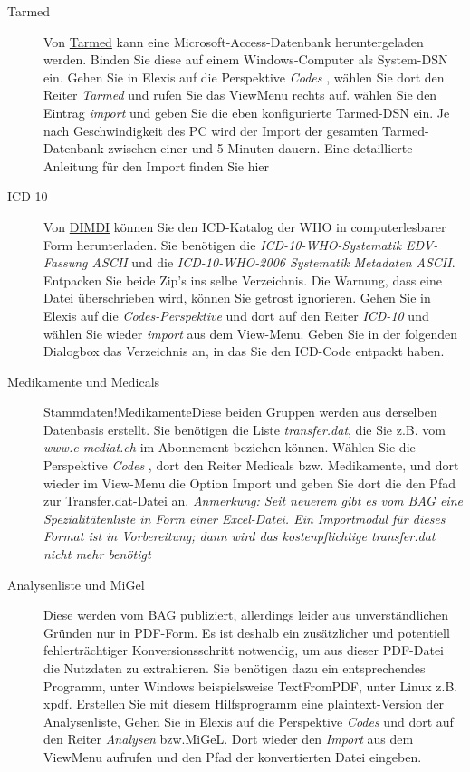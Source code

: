 \begin{description}
 \item[Tarmed] Von \href{www.tarmedsuisse.ch}{Tarmed} kann eine Microsoft-Access-Datenbank heruntergeladen werden. Binden Sie diese auf einem Windows-Computer als System-DSN ein. Gehen Sie in Elexis auf die Perspektive  \textit{Codes} , wählen Sie dort den Reiter  \textit{Tarmed}  und rufen Sie das ViewMenu rechts auf. wählen Sie den Eintrag  \textit{import}  und geben Sie die eben konfigurierte Tarmed-DSN ein. Je nach Geschwindigkeit des PC wird der Import der gesamten Tarmed-Datenbank zwischen einer und 5 Minuten dauern. Eine detaillierte Anleitung für den Import finden Sie hier
 \item[ICD-10] Von \href{http://www.dimdi.de/dynamic/de/klassi/downloadcenter/icd-10-who/version2006/systematik/}{DIMDI} können Sie den ICD-Katalog der WHO in computerlesbarer Form herunterladen. Sie benötigen die \textit{ICD-10-WHO-Systematik EDV-Fassung ASCII} und die \textit{ICD-10-WHO-2006 Systematik Metadaten ASCII}. Entpacken Sie beide Zip's ins selbe Verzeichnis. Die Warnung, dass eine Datei überschrieben wird, können Sie getrost ignorieren. Gehen Sie in Elexis auf die \textit{Codes-Perspektive} und dort auf den Reiter  \textit{ICD-10}  und wählen Sie wieder  \textit{import}  aus dem View-Menu. Geben Sie in der folgenden Dialogbox das Verzeichnis an, in das Sie den ICD-Code entpackt haben.
 \item[Medikamente und Medicals] \indexname{Stammdaten!Medikamente}Diese beiden Gruppen werden aus derselben Datenbasis erstellt. Sie benötigen die Liste \textit{transfer.dat}, die Sie z.B. vom \textit{www.e-mediat.ch} im Abonnement beziehen können. Wählen Sie die Perspektive  \textit{Codes} , dort den Reiter Medicals bzw. Medikamente, und dort wieder im View-Menu die Option Import und geben Sie dort die den Pfad zur Transfer.dat-Datei an.
\textit{Anmerkung: Seit neuerem gibt es vom BAG eine Spezialitätenliste in Form einer Excel-Datei. Ein Importmodul für dieses Format ist in Vorbereitung; dann wird das kostenpflichtige transfer.dat nicht mehr benötigt  }
 \item[Analysenliste und MiGel] Diese werden vom BAG publiziert, allerdings leider aus unverständlichen Gründen nur in PDF-Form. Es ist deshalb ein zusätzlicher und potentiell fehlerträchtiger Konversionsschritt notwendig, um aus dieser PDF-Datei die Nutzdaten zu extrahieren. Sie benötigen dazu ein entsprechendes Programm, unter Windows beispielsweise TextFromPDF, unter Linux z.B. xpdf. Erstellen Sie mit diesem Hilfsprogramm eine plaintext-Version der Analysenliste, Gehen Sie in Elexis auf die Perspektive \textit{Codes}  und dort auf den Reiter \textit{Analysen} bzw.MiGeL. Dort wieder den \textit{Import} aus dem ViewMenu aufrufen und den Pfad der konvertierten Datei eingeben.
 \end{description}

